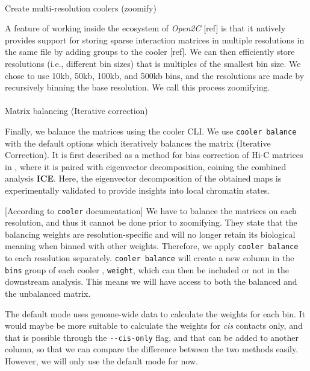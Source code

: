 \documentclass[
  11pt,
  a4paper,
]{scrbook}
\makeatletter
\let\oldparagraph\paragraph
\renewcommand{\paragraph}{
    \@ifstar
      \xxxParagraphStar
      \xxxParagraphNoStar
  }
\newcommand{\xxxParagraphStar}[1]{\oldparagraph*{#1}\mbox{}}
\newcommand{\xxxParagraphNoStar}[1]{\oldparagraph{#1}\mbox{}}
\let\oldemph\emph
\renewcommand\emph[1]{\oldemph{\color{gray}#1}}
\makeatother
\begin{document}
\paragraph{Create multi-resolution coolers
(zoomify)}\label{create-multi-resolution-coolers-zoomify}

A feature of working inside the ecosystem of \emph{Open2C} {[}ref{]} is
that it natively provides support for storing sparse interaction
matrices in multiple resolutions in the same file by adding groups to
the cooler {[}ref{]}. We can then efficiently store resolutions (i.e.,
different bin sizes) that is multiples of the smallest bin size. We
chose to use 10kb, 50kb, 100kb, and 500kb bins, and the resolutions are
made by recursively binning the base resolution. We call this process
zoomifying.

\paragraph{Matrix balancing (Iterative
correction)}\label{matrix-balancing-iterative-correction}

Finally, we balance the matrices using the cooler CLI. We use
\texttt{cooler\ balance} with the default options which iteratively
balances the matrix (Iterative Correction). It is first described as a
method for bias correction of Hi-C matrices in
\citep{imakaev_iterative_2012}, where it is paired with eigenvector
decomposition, coining the combined analysis \textbf{ICE}. Here, the
eigenvector decomposition of the obtained maps is experimentally
validated to provide insights into local chromatin states.

{[}According to \texttt{cooler} documentation{]} We have to balance the
matrices on each resolution, and thus it cannot be done prior to
zoomifying. They state that the balancing weights are
resolution-specific and will no longer retain its biological meaning
when binned with other weights. Therefore, we apply
\texttt{cooler\ balance} to each resolution separately.
\texttt{cooler\ balance} will create a new column in the \texttt{bins}
group of each cooler , \texttt{weight}, which can then be included or
not in the downstream analysis. This means we will have access to both
the balanced and the unbalanced matrix.

The default mode uses genome-wide data to calculate the weights for each
bin. It would maybe be more suitable to calculate the weights for
\emph{cis} contacts only, and that is possible through the
\texttt{-\/-cis-only} flag, and that can be added to another column, so
that we can compare the difference between the two methods easily.
However, we will only use the default mode for now.
\end{document}
